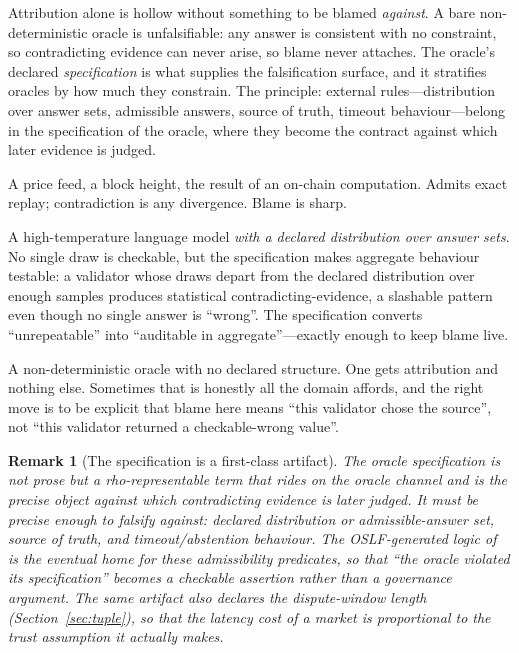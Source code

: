 \documentclass[11pt]{article}
\newtheorem{remark}{Remark}[section]
\begin{document}
Attribution alone is hollow without something to be blamed \emph{against}. A bare
non-deterministic oracle is unfalsifiable: any answer is consistent with no constraint, so
contradicting evidence can never arise, so blame never attaches. The oracle's declared
\emph{specification} is what supplies the falsification surface, and it stratifies oracles by
how much they constrain. The principle: external rules---distribution over answer sets,
admissible answers, source of truth, timeout behaviour---belong in the specification of the
oracle, where they become the contract against which later evidence is judged.

\begin{description}[leftmargin=1.4em,itemsep=0.3em]
\item[Deterministic.] A price feed, a block height, the result of an on-chain computation.
Admits exact replay; contradiction is any divergence. Blame is sharp.
\item[Distributional.] A high-temperature language model \emph{with a declared distribution
over answer sets}. No single draw is checkable, but the specification makes aggregate
behaviour testable: a validator whose draws depart from the declared distribution over enough
samples produces statistical contradicting-evidence, a slashable pattern even though no single
answer is ``wrong''. The specification converts ``unrepeatable'' into ``auditable in
aggregate''---exactly enough to keep blame live.
\item[Bare.] A non-deterministic oracle with no declared structure. One gets attribution and
nothing else. Sometimes that is honestly all the domain affords, and the right move is to be
explicit that blame here means ``this validator chose the source'', not ``this validator
returned a checkable-wrong value''.
\end{description}

\begin{remark}[The specification is a first-class artifact]
The oracle specification is not prose but a rho-representable term that rides on the oracle
channel and is the precise object against which contradicting evidence is later judged. It
must be precise enough to falsify against: declared distribution or admissible-answer set,
source of truth, and timeout/abstention behaviour. The OSLF-generated logic
of~\cite[\S8]{finrho} is the eventual home for these admissibility predicates, so that ``the
oracle violated its specification'' becomes a checkable assertion rather than a governance
argument. The same artifact also declares the dispute-window length
(Section~\ref{sec:tuple}), so that the latency cost of a market is proportional to the trust
assumption it actually makes.
\end{remark}
\end{document}
